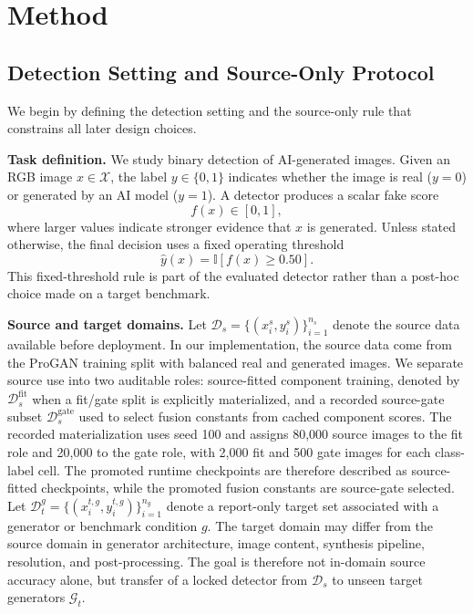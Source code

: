 \documentclass[lettersize,journal]{IEEEtran}
\begin{document}
\section{Method}
\label{sec:method}

\subsection{Detection Setting and Source-Only Protocol}
\label{sec:problem_formulation}

We begin by defining the detection setting and the source-only rule that constrains all later design choices.

\textbf{Task definition.}
We study binary detection of AI-generated images. Given an RGB image $x \in \mathcal{X}$, the label $y \in \{0,1\}$ indicates whether the image is real ($y=0$) or generated by an AI model ($y=1$). A detector produces a scalar fake score
\begin{equation}
    f(x) \in [0,1],
\end{equation}
where larger values indicate stronger evidence that $x$ is generated. Unless stated otherwise, the final decision uses a fixed operating threshold
\begin{equation}
    \hat{y}(x) = \mathbb{I}\left[f(x) \geq 0.50\right].
\end{equation}
This fixed-threshold rule is part of the evaluated detector rather than a post-hoc choice made on a target benchmark.

\textbf{Source and target domains.}
Let $\mathcal{D}_{s}=\{(x_i^s,y_i^s)\}_{i=1}^{n_s}$ denote the source data available before deployment. In our implementation, the source data come from the ProGAN training split with balanced real and generated images. We separate source use into two auditable roles: source-fitted component training, denoted by $\mathcal{D}_{s}^{\mathrm{fit}}$ when a fit/gate split is explicitly materialized, and a recorded source-gate subset $\mathcal{D}_{s}^{\mathrm{gate}}$ used to select fusion constants from cached component scores. The recorded materialization uses seed 100 and assigns 80,000 source images to the fit role and 20,000 to the gate role, with 2,000 fit and 500 gate images for each class-label cell. The promoted runtime checkpoints are therefore described as source-fitted checkpoints, while the promoted fusion constants are source-gate selected. Let $\mathcal{D}_{t}^{g}=\{(x_i^{t,g},y_i^{t,g})\}_{i=1}^{n_g}$ denote a report-only target set associated with a generator or benchmark condition $g$. The target domain may differ from the source domain in generator architecture, image content, synthesis pipeline, resolution, and post-processing. The goal is therefore not in-domain source accuracy alone, but transfer of a locked detector from $\mathcal{D}_{s}$ to unseen target generators $\mathcal{G}_{t}$.
\end{document}
